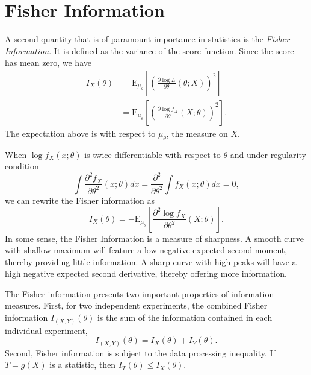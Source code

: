 \section{Fisher Information}

A second quantity that is of paramount importance in statistics is the \emph{Fisher Information}.
It is defined as the variance of the score function.
Since the score has mean zero, we have
\begin{equation*}
\begin{split}
I_X (\theta)
&= \mathrm{E}_{\mu_{\theta}} \left[ \left( \frac{\partial \log L}{\partial \theta} (\theta; X) \right)^2 \right] \\
&= \mathrm{E}_{\mu_{\theta}} \left[ \left( \frac{\partial \log f_X}{\partial \theta} (X; \theta) \right)^2 \right] .
\end{split}
\end{equation*}
The expectation above is with respect to $\mu_{\theta}$, the measure on $X$.

When $\log f_X (x; \theta)$ is twice differentiable with respect to $\theta$ and under regularity condition
\begin{equation*}
\int \frac{\partial^2 f_X}{\partial \theta^2} (x; \theta) dx
= \frac{\partial^2}{\partial \theta^2} \int f_X (x; \theta) dx = 0 ,
\end{equation*}
we can rewrite the Fisher information as
\begin{equation} \label{equation:FisherInformation2}
I_X (\theta)
= - \mathrm{E}_{\mu_{\theta}} \left[ \frac{\partial^2 \log f_X}{\partial \theta^2} (X; \theta) \right] .
\end{equation}
In some sense, the Fisher Information is a measure of sharpness.
A smooth curve with shallow maximum will feature a low negative expected second moment, thereby providing little information.
A sharp curve with high peaks will have a high negative expected second derivative, thereby offering more information.

The Fisher information presents two important properties of information measures.
First, for two independent experiments, the combined Fisher information $I_{(X,Y)} (\theta)$ is the sum of the information contained in each individual experiment,
\begin{equation*}
I_{(X,Y)} (\theta) = I_{X} (\theta) + I_{Y} (\theta) .
\end{equation*}
Second, Fisher information is subject to the data processing inequality.
If $T = g(X)$ is a statistic, then $I_T (\theta) \leq I_X (\theta)$.


